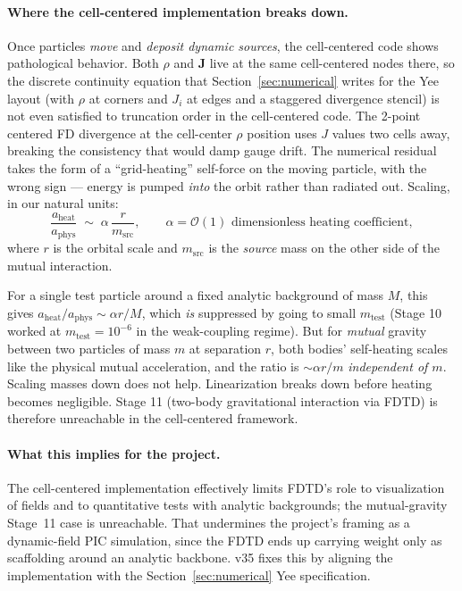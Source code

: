 \documentclass[11pt,a4paper]{article}
\newcommand{\vv}[1]{\mathbf{#1}}
\begin{document}
\paragraph{Where the cell-centered implementation breaks down.}  Once
particles \emph{move} and \emph{deposit dynamic sources}, the
cell-centered code shows pathological behavior.  Both $\rho$ and
$\vv{J}$ live at the same cell-centered nodes there, so the discrete
continuity equation that Section~\ref{sec:numerical} writes for the
Yee layout (with $\rho$ at corners and $J_i$ at edges and a
staggered divergence stencil) is not even satisfied to truncation
order in the cell-centered code.  The 2-point centered FD divergence
at the cell-center $\rho$ position uses $J$ values two cells away,
breaking the consistency that would damp gauge drift.  The numerical
residual takes the form of a ``grid-heating'' self-force on the
moving particle, with the wrong sign — energy is pumped \emph{into}
the orbit rather than radiated out.  Scaling, in our natural units:
\begin{equation}
  \frac{a_{\mathrm{heat}}}{a_{\mathrm{phys}}} \;\sim\; \alpha\,\frac{r}{m_{\mathrm{src}}},
  \qquad \alpha = \mathcal{O}(1)\text{ dimensionless heating coefficient},
\end{equation}
where $r$ is the orbital scale and $m_{\mathrm{src}}$ is the
\emph{source} mass on the other side of the mutual interaction.

For a single test particle around a fixed analytic background of
mass $M$, this gives $a_{\mathrm{heat}}/a_{\mathrm{phys}} \sim \alpha r / M$, which
\emph{is} suppressed by going to small $m_{\mathrm{test}}$ (Stage 10 worked
at $m_{\mathrm{test}} = 10^{-6}$ in the weak-coupling regime).  But for
\emph{mutual} gravity between two particles of mass $m$ at separation
$r$, both bodies' self-heating scales like the physical mutual
acceleration, and the ratio is $\sim \alpha r/m$ \emph{independent of
$m$}.  Scaling masses down does not help.  Linearization breaks
down before heating becomes negligible.  Stage 11 (two-body
gravitational interaction via FDTD) is therefore unreachable in the
cell-centered framework.

\paragraph{What this implies for the project.}  The cell-centered
implementation effectively limits FDTD's role to visualization of
fields and to quantitative tests with analytic backgrounds; the
mutual-gravity Stage~11 case is unreachable.  That undermines the
project's framing as a dynamic-field PIC simulation, since the FDTD
ends up carrying weight only as scaffolding around an analytic
backbone.  v35 fixes this by aligning the implementation with the
Section~\ref{sec:numerical} Yee specification.
\end{document}
